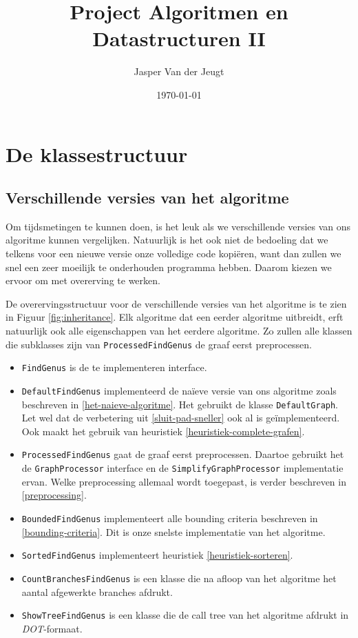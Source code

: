 \documentclass{article}
\title{Project Algoritmen en Datastructuren II}
\author{Jasper Van der Jeugt}
\date{\today}
\begin{document}
\maketitle
\tableofcontents

\section{De klassestructuur}

\subsection{Verschillende versies van het algoritme}
Om tijdsmetingen te kunnen doen, is het leuk als we verschillende versies van
ons algoritme kunnen vergelijken. Natuurlijk is het ook niet de bedoeling dat
we telkens voor een nieuwe versie onze volledige code kopi\"eren, want dan
zullen we snel een zeer moeilijk te onderhouden programma hebben. Daarom kiezen
we ervoor om met overerving te werken.
\newline

De overervingsstructuur voor de verschillende versies van het algoritme is te
zien in Figuur \ref{fig:inheritance}. Elk algoritme dat een eerder algoritme
uitbreidt, erft natuurlijk ook alle eigenschappen van het eerdere algoritme.
Zo zullen alle klassen die subklasses zijn van \verb#ProcessedFindGenus# de
graaf eerst preprocessen.
\newline

\begin{itemize}
\item \verb#FindGenus# is de te implementeren interface.
\item \verb#DefaultFindGenus# implementeerd de na\"ieve versie van ons algoritme
zoals beschreven in \ref{het-naieve-algoritme}. Het gebruikt de klasse
\verb#DefaultGraph#. Let wel dat de verbetering uit \ref{sluit-pad-sneller} ook
al is ge\"implementeerd. Ook maakt het gebruik van heuristiek
\ref{heuristiek-complete-grafen}.
\item \verb#ProcessedFindGenus# gaat de graaf eerst preprocessen. Daartoe
gebruikt het de \verb#GraphProcessor# interface en de
\verb#SimplifyGraphProcessor# implementatie ervan. Welke preprocessing allemaal
wordt toegepast, is verder beschreven in \ref{preprocessing}.
\item \verb#BoundedFindGenus# implementeert alle bounding criteria beschreven
in \ref{bounding-criteria}. Dit is onze snelste implementatie van het algoritme.
\item \verb#SortedFindGenus# implementeert heuristiek \ref{heuristiek-sorteren}.
\item \verb#CountBranchesFindGenus# is een klasse die na afloop van het
algoritme het aantal afgewerkte branches afdrukt.
\item \verb#ShowTreeFindGenus# is een klasse die de call tree van het algoritme
afdrukt in \emph{DOT}-formaat.
\end{itemize}
\end{document}
